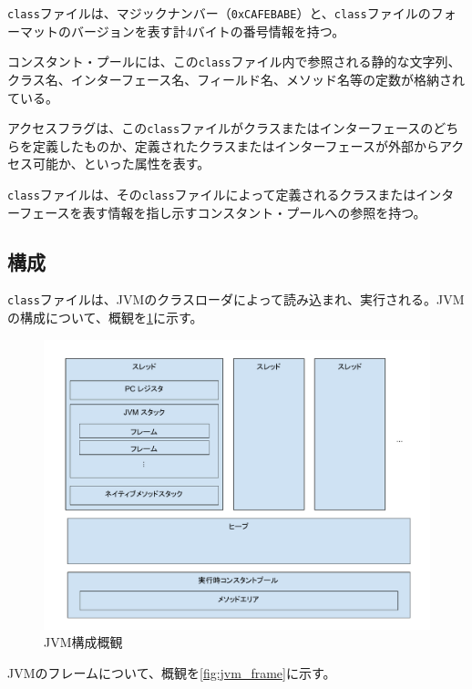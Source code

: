 \verb|class|ファイルは、マジックナンバー（\verb|0xCAFEBABE|）と、\verb|class|ファイルのフォーマットのバージョンを表す計4バイトの番号情報を持つ。

コンスタント・プールには、この\verb|class|ファイル内で参照される静的な文字列、クラス名、インターフェース名、フィールド名、メソッド名等の定数が格納されている。

アクセスフラグは、この\verb|class|ファイルがクラスまたはインターフェースのどちらを定義したものか、定義されたクラスまたはインターフェースが外部からアクセス可能か、といった属性を表す。

\verb|class|ファイルは、その\verb|class|ファイルによって定義されるクラスまたはインターフェースを表す情報を指し示すコンスタント・プールへの参照を持つ。

\subsection{構成}

\verb|class|ファイルは、JVMのクラスローダによって読み込まれ、実行される。JVMの構成について、概観を\ref{fig:jvm_architecture}に示す。

\begin{figure}[htbp]
  \caption{JVM構成概観}
  \label{fig:jvm_architecture}
  \begin{center}
    \includegraphics[bb=0 0 800 600,width=12cm]{img/jvm_architecture.pdf}
  \end{center}
\end{figure}

JVMのフレームについて、概観を\ref{fig:jvm_frame}に示す。

